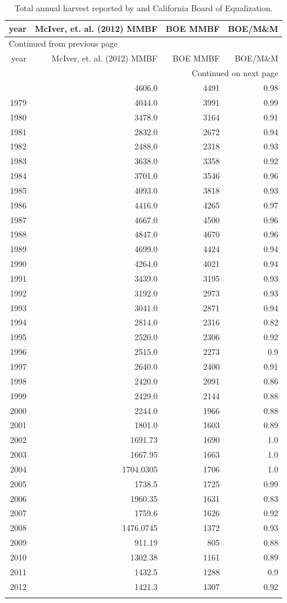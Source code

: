\documentclass[a4paper]{article}
\begin{document}
\begin{longtable}{rrrr}
year & McIver, et. al. (2012) MMBF & BOE MMBF & BOE/M\&M\\
\hline
\endfirsthead
\multicolumn{4}{l}{Continued from previous page} \\
\hline

year & McIver, et. al. (2012) MMBF & BOE MMBF & BOE/M\&M \\

\hline
\endhead
\hline\multicolumn{4}{r}{Continued on next page} \\
\endfoot
\endlastfoot
\hline
1978 & 4606.0 & 4491 & 0.98\\
1979 & 4044.0 & 3991 & 0.99\\
1980 & 3478.0 & 3164 & 0.91\\
1981 & 2832.0 & 2672 & 0.94\\
1982 & 2488.0 & 2318 & 0.93\\
1983 & 3638.0 & 3358 & 0.92\\
1984 & 3701.0 & 3546 & 0.96\\
1985 & 4093.0 & 3818 & 0.93\\
1986 & 4416.0 & 4265 & 0.97\\
1987 & 4667.0 & 4500 & 0.96\\
1988 & 4847.0 & 4670 & 0.96\\
1989 & 4699.0 & 4424 & 0.94\\
1990 & 4264.0 & 4021 & 0.94\\
1991 & 3439.0 & 3195 & 0.93\\
1992 & 3192.0 & 2973 & 0.93\\
1993 & 3041.0 & 2871 & 0.94\\
1994 & 2814.0 & 2316 & 0.82\\
1995 & 2520.0 & 2306 & 0.92\\
1996 & 2515.0 & 2273 & 0.9\\
1997 & 2640.0 & 2400 & 0.91\\
1998 & 2420.0 & 2091 & 0.86\\
1999 & 2429.0 & 2144 & 0.88\\
2000 & 2244.0 & 1966 & 0.88\\
2001 & 1801.0 & 1603 & 0.89\\
2002 & 1691.73 & 1690 & 1.0\\
2003 & 1667.95 & 1663 & 1.0\\
2004 & 1704.0305 & 1706 & 1.0\\
2005 & 1738.5 & 1725 & 0.99\\
2006 & 1960.35 & 1631 & 0.83\\
2007 & 1759.6 & 1626 & 0.92\\
2008 & 1476.0745 & 1372 & 0.93\\
2009 & 911.19 & 805 & 0.88\\
2010 & 1302.38 & 1161 & 0.89\\
2011 & 1432.5 & 1288 & 0.9\\
2012 & 1421.3 & 1307 & 0.92\\
\caption{Total annual harvest reported by \citet{Mciver2012} and California Board of Equalization.\label{tab:tpo_boe}}
\\
\end{longtable}
\end{document}
